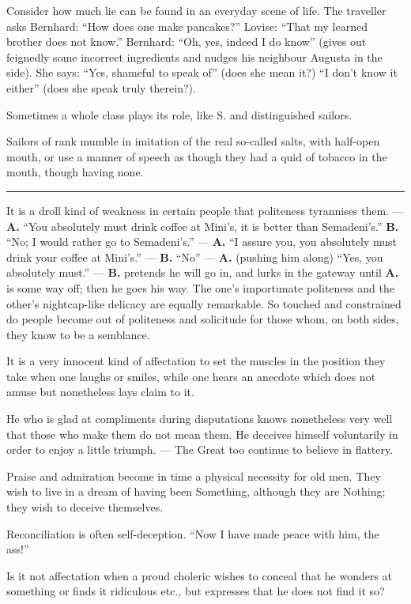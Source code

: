 \documentclass[12pt]{article}
\newcommand{\opage}[1]{\marginnote{\footnotesize\textit{[#1]}}}
\newcommand{\ombreak}{\par\medskip\begin{center}\rule{0.32\textwidth}{0.4pt}\end{center}\medskip}
\begin{document}
Consider how much lie can be found in an everyday scene of life. The traveller asks Bernhard: ``How \opage{180}does one make pancakes?'' Lovise: ``That my learned brother does not know.'' Bernhard: ``Oh, yes, indeed I do know'' (gives out feignedly some incorrect ingredients and nudges his neighbour Augusta in the side). She says: ``Yes, shameful to speak of'' (does she mean it?) ``I don't know it either'' (does she speak truly therein?).

Sometimes a whole class plays its role, like S. and distinguished sailors.

Sailors of rank mumble in imitation of the real so-called salts, with half-open mouth, or use a manner of speech as though they had a quid of tobacco in the mouth, though having none.

\ombreak

It is a droll kind of weakness in certain people that politeness tyrannises them. --- \textbf{A.} ``You absolutely must drink coffee at Mini's, it is better than Semadeni's.'' \textbf{B.} ``No; I would rather go to Semadeni's.'' --- \textbf{A.} ``I assure you, you absolutely must drink your coffee at Mini's.'' --- \textbf{B.} ``No'' --- \textbf{A.} (pushing him along) ``Yes, you absolutely must.'' --- \textbf{B.} pretends he will go in, and lurks in the gateway until \textbf{A.} is some way off; then he goes his way. The one's importunate politeness and the other's nightcap-like delicacy are equally remarkable. So touched and constrained do people become out of politeness and solicitude for those whom, on both sides, they know to be a semblance.

It is a very innocent kind of affectation to set the muscles in the position they take when one laughs or smiles, while one hears an anecdote which does not amuse but nonetheless lays claim to it.

\opage{181}He who is glad at compliments during disputations knows nonetheless very well that those who make them do not mean them. He deceives himself voluntarily in order to enjoy a little triumph. --- The Great too continue to believe in flattery.

Praise and admiration become in time a physical necessity for old men. They wish to live in a dream of having been Something, although they are Nothing; they wish to deceive themselves.

Reconciliation is often self-deception. ``Now I have made peace with him, the ass!''

Is it not affectation when a proud choleric wishes to conceal that he wonders at something or finds it ridiculous etc., but expresses that he does not find it so?
\end{document}
